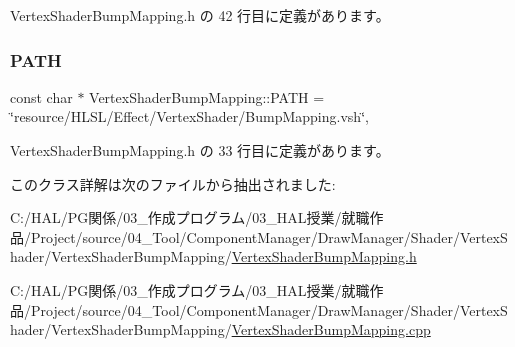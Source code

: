  Vertex\+Shader\+Bump\+Mapping.\+h の 42 行目に定義があります。

\mbox{\label{class_vertex_shader_bump_mapping_aa4b686f9aeb9e327ca79adf5974bc86d}} 
\subsubsection{\texorpdfstring{P\+A\+TH}{PATH}}
{\footnotesize\ttfamily const char $\ast$ Vertex\+Shader\+Bump\+Mapping\+::\+P\+A\+TH = \char`\"{}resource/H\+L\+SL/Effect/Vertex\+Shader/Bump\+Mapping.\+vsh\char`\"{}\hspace{0.3cm}{\ttfamily [static]}, {\ttfamily [private]}}



 Vertex\+Shader\+Bump\+Mapping.\+h の 33 行目に定義があります。



このクラス詳解は次のファイルから抽出されました\+:\begin{DoxyCompactItemize}
\item 
C\+:/\+H\+A\+L/\+P\+G関係/03\+\_\+作成プログラム/03\+\_\+\+H\+A\+L授業/就職作品/\+Project/source/04\+\_\+\+Tool/\+Component\+Manager/\+Draw\+Manager/\+Shader/\+Vertex\+Shader/\+Vertex\+Shader\+Bump\+Mapping/\mbox{\hyperlink{_vertex_shader_bump_mapping_8h}{Vertex\+Shader\+Bump\+Mapping.\+h}}\item 
C\+:/\+H\+A\+L/\+P\+G関係/03\+\_\+作成プログラム/03\+\_\+\+H\+A\+L授業/就職作品/\+Project/source/04\+\_\+\+Tool/\+Component\+Manager/\+Draw\+Manager/\+Shader/\+Vertex\+Shader/\+Vertex\+Shader\+Bump\+Mapping/\mbox{\hyperlink{_vertex_shader_bump_mapping_8cpp}{Vertex\+Shader\+Bump\+Mapping.\+cpp}}\end{DoxyCompactItemize}

